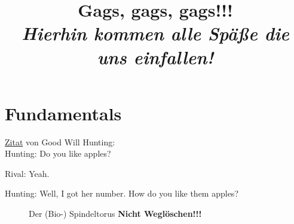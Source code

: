\documentclass{article}
\title
{
  Gags, gags, gags!!! \\
  \vspace{4pt}
  \normalsize
  \textit{Hierhin kommen alle Späße die uns einfallen!}
}
\author{}
\date{}
\begin{document}
\maketitle

\section{Fundamentals}

\href{https://knowyourphrase.com/how-do-you-like-them-apples}{Zitat} von \glqq Good Will Hunting\grqq: \\

Hunting: \glqq Do you like apples?\grqq

Rival: \glqq Yeah.\grqq

Hunting: \glqq Well, I got her number. How do you like them apples?\grqq

\begin{figure}[H]
\centering
{}
\hspace{0mm}
\caption{Der (Bio-) Spindeltorus \textbf{Nicht Weglöschen!!!}}
\label{fig:apfel_apple}
\end{figure}
\end{document}

